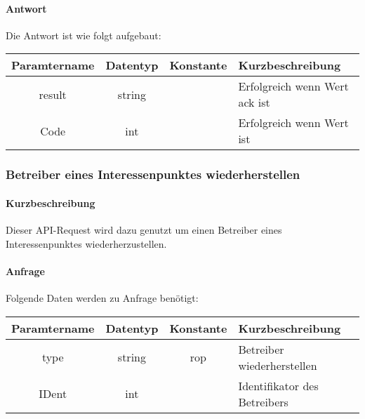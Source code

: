 \paragraph{Antwort}Die Antwort ist wie folgt aufgebaut:
\begin{table}[H]
	\begin{tabular}{|c|c|c|p{6.5cm}|}
		\hline
		\textbf{Paramtername} & \textbf{Datentyp} & \textbf{Konstante} & \textbf{Kurzbeschreibung}                                                                                               \\ \hline
		result              & string           &                 & Erfolgreich wenn Wert {\glqq ack\grqq} ist \\ \hline
		Code                & int              &                 & Erfolgreich wenn Wert {\glqq 0\grqq} ist \\ \hline
	\end{tabular}
\end{table}
\subsubsection{Betreiber eines Interessenpunktes wiederherstellen}
\paragraph{Kurzbeschreibung}Dieser API-Request wird dazu genutzt um einen Betreiber eines Interessenpunktes wiederherzustellen.
\paragraph{Anfrage}Folgende Daten werden zu Anfrage benötigt:
\begin{table}[H]
	\begin{tabular}{|c|c|c|p{6.5cm}|}
		\hline
		\textbf{Paramtername} & \textbf{Datentyp} & \textbf{Konstante} & \textbf{Kurzbeschreibung}                                                                                               \\ \hline
		type                & string            & rop                & Betreiber wiederherstellen \\ \hline
		IDent               & int               &                    & Identifikator des Betreibers \\ \hline
	\end{tabular}
\end{table}
